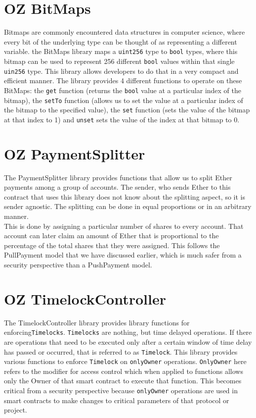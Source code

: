 \section{OZ BitMaps}
Bitmaps are commonly encountered data structures in computer science, where every bit of the underlying type can be thought of as representing a different variable. the BitMaps library maps a \verb|uint256| type to \verb|bool| types, where this bitmap can be used to represent 256 different \verb|bool| values within that single \verb|uin256| type. This library allows developers to do that in a very compact and efficient manner. The library provides 4 different functions to operate on these BitMaps: the \verb|get| function (returns the \verb|bool| value at a particular index of the bitmap), the \verb|setTo| function (allows us to set the value at a particular index of the bitmap to the specified value), the \verb|set| function (sets the value of the bitmap at that index to 1) and \verb|unset| sets the value of the index at that bitmap to 0.

\section{OZ PaymentSplitter}
The PaymentSplitter library provides functions that allow us to split Ether payments among a group of accounts. The sender, who sends Ether to this contract that uses this library does not know about the splitting aspect, so it is sender agnostic. The splitting can be done in equal proportions or in an arbitrary manner.\\

This is done by assigning a particular number of shares to every account. That account can later claim an amount of Ether that is proportional to the percentage of the total shares that they were assigned. This follows the PullPayment model that we have discussed earlier, which is much safer from a security perspective than a PushPayment model.

\section{OZ TimelockController}
The TimelockController library provides library functions for enforcing\linebreak\verb|Timelocks|. \verb|Timelocks| are nothing, but time delayed operations. If there are operations that need to be executed only after a certain window of time delay has passed or occurred, that is referred to as \verb|Timelock|. This library provides various functions to enforce \verb|Timelock| on \verb|onlyOwner| operations. \verb|OnlyOwner| here refers to the modifier for access control which when applied to functions allows only the Owner of that smart contract to execute that function. This becomes critical from a security perspective because \verb|onlyOwner| operations are used in smart contracts to make changes to critical parameters of that protocol or project.\\

